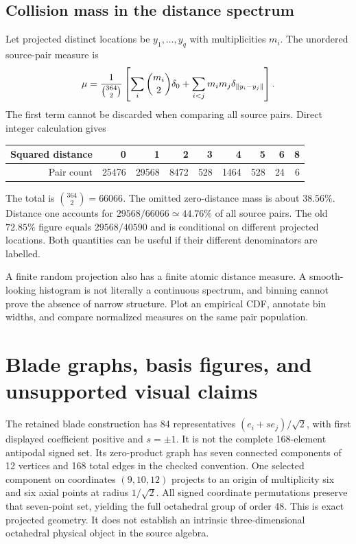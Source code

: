 \documentclass[11pt,a4paper]{article}
\begin{document}
\subsection{Collision mass in the distance spectrum}
Let projected distinct locations be $y_1,\ldots,y_q$ with multiplicities $m_i$. The unordered source-pair measure is
\begin{equation}\label{eq:pairs}
\mu=\frac{1}{\binom{364}{2}}
\left[\sum_i\binom{m_i}{2}\delta_0+
\sum_{i<j}m_im_j\delta_{\left\lVert y_i-y_j\right\rVert}\right].
\end{equation}
The first term cannot be discarded when comparing all source pairs. Direct integer calculation gives
\begin{center}\begin{tabular}{rrrrrrrrr}\toprule
Squared distance&0&1&2&3&4&5&6&8\\\midrule
Pair count&25476&29568&8472&528&1464&528&24&6\\\bottomrule
\end{tabular}\end{center}
The total is $\binom{364}{2}=66066$. The omitted zero-distance mass is about $38.56\%$. Distance one accounts for $29568/66066\simeq44.76\%$ of all source pairs. The old $72.85\%$ figure equals $29568/40590$ and is conditional on different projected locations. Both quantities can be useful if their different denominators are labelled.

A finite random projection also has a finite atomic distance measure. A smooth-looking histogram is not literally a continuous spectrum, and binning cannot prove the absence of narrow structure. Plot an empirical CDF, annotate bin widths, and compare normalized measures on the same pair population.

\section{Blade graphs, basis figures, and unsupported visual claims}
The retained blade construction has 84 representatives $(e_i+s e_j)/\sqrt2$, with first displayed coefficient positive and $s=\pm1$. It is not the complete 168-element antipodal signed set. Its zero-product graph has seven connected components of 12 vertices and 168 total edges in the checked convention. One selected component on coordinates $(9,10,12)$ projects to an origin of multiplicity six and six axial points at radius $1/\sqrt2$. All signed coordinate permutations preserve that seven-point set, yielding the full octahedral group of order 48. This is exact projected geometry. It does not establish an intrinsic three-dimensional octahedral physical object in the source algebra.
\end{document}
